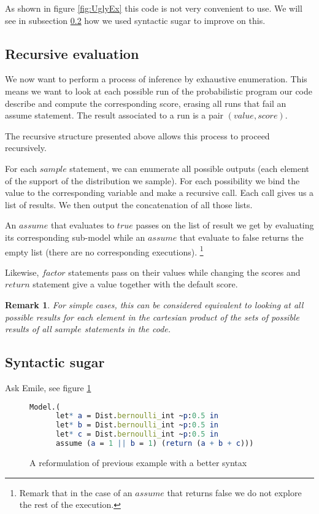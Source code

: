 \documentclass{article}
\newcommand\SC[1]{{\color{violet}{\it \bf Simon :} #1}}
\newtheorem{remark}{Remark}
\begin{document}
	As shown in figure \ref{fig:UglyEx} this code is not very convenient to use. We will see in subsection \ref{subseq:sugar} how we used syntactic sugar to improve on this.

	\subsection{Recursive evaluation}

	We now want to perform a process of inference by exhaustive enumeration.
	This means we want to look at each possible run of the probabilistic program our code describe and compute the corresponding score, erasing all runs that fail an assume statement.
	The result associated to a run is a pair $(value, score)$.

	The recursive structure presented above allows this process to proceed recursively.

	For each $sample$ statement, we can enumerate all possible outputs (each element of the support of the distribution we sample). For each possibility we bind the value to the corresponding variable and make a recursive call.
	Each call gives us a list of results. We then output the concatenation of all those lists.

	An $assume$ that evaluates to $true$ passes on the list of result we get by evaluating its corresponding sub-model while an $assume$ that evaluate to false returns the empty list (there are no corresponding executions).
	\footnote{Remark that in the case of an $assume$ that returns false we do not explore the rest of the execution.}

	Likewise, $factor$ statements pass on their values while changing the scores and $return$ statement give a value together with the default score.

	\begin{remark}
	  For simple cases, this can be considered equivalent to looking at all possible results for each element in the cartesian product of the sets of possible results of all $sample$ statements in the code.
	\end{remark}

	\subsection{Syntactic sugar}
	\label{subseq:sugar}

	\SC{Ask Emile, see figure \ref{fig:sugar}}

	\begin{figure}[h]
	  \centering
	\begin{lstlisting}[language=Mathematica,frame=single]
    Model.(
      let* a = Dist.bernoulli_int ~p:0.5 in
      let* b = Dist.bernoulli_int ~p:0.5 in
      let* c = Dist.bernoulli_int ~p:0.5 in
      assume (a = 1 || b = 1) (return (a + b + c)))
	\end{lstlisting}
	\caption{A reformulation of previous example with a better syntax}
	  \label{fig:sugar}
	\end{figure}
\end{document}
